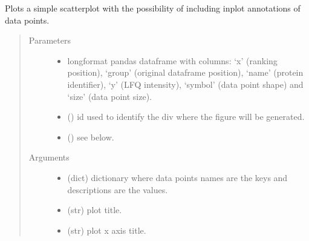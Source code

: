 \documentclass[letterpaper,10pt,english]{sphinxmanual}
\begin{document}

\begin{fulllineitems}
\label{\detokenize{_autosummary/analytics_core.viz:analytics_core.viz.viz.get_simple_scatterplot}}
Plots a simple scatterplot with the possibility of including in\sphinxhyphen{}plot annotations of data points.
\begin{quote}\begin{description}
\item[{Parameters}] \leavevmode\begin{itemize}
\item {} 
 \textendash{} long\sphinxhyphen{}format pandas dataframe with columns: ‘x’ (ranking position), ‘group’ (original dataframe position),                     ‘name’ (protein identifier), ‘y’ (LFQ intensity), ‘symbol’ (data point shape) and ‘size’ (data point size).

\item {} 
 () \textendash{} id used to identify the div where the figure will be generated.

\item {} 
 () \textendash{} see below.

\end{itemize}

\item[{Arguments}] \leavevmode\begin{itemize}
\item {} 
 (dict) \textendash{} dictionary where data points names are the keys and descriptions are the values.

\item {} 
 (str) \textendash{} plot title.

\item {} 
 (str) \textendash{} plot x axis title.


\end{itemize}
\end{description}
\end{quote}
\end{fulllineitems}
\end{document}
